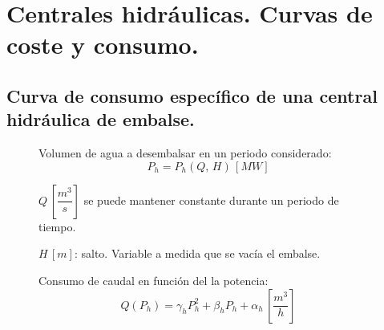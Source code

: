 	\newpage
		
	\section{Centrales hidráulicas. Curvas de coste y consumo.}
		\subsection{Curva de consumo específico de una central hidráulica de embalse.}
			\begin{figure}[H]
				\begin{minipage}{0.5\textwidth}
					Volumen de agua a desembalsar en un periodo considerado:
					\[P_h = P_h(Q,\,H)\,[MW]\]
					
					$Q \, \left[\dfrac{m^3}{s}\right]$ se puede mantener constante durante un periodo de tiempo.
					
					$H \, \left[m\right]$: salto. Variable a medida que se vacía el embalse.
					
					\vspace{0.5cm}
					Consumo de caudal en función del la potencia:
					\[Q(P_h) = \gamma_h P_h^2 + \beta_h P_h + \alpha_h\,\left[\dfrac{m^3}{h}\right]\]
					

\end{minipage}
\end{figure}
